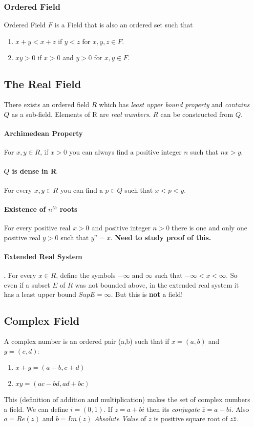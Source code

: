 \documentclass{article}
\begin{document}
	  \subsubsection{Ordered Field}
	  Ordered Field $F$ is a Field that is also an ordered set such that 
	  \begin{enumerate}
	  	\item $x + y < x + z$ if $y < z$ for $x,y,z \in F$.
	  	\item $xy > 0$ if $x > 0$ and $y > 0$ for $x,y \in F$.
	  \end{enumerate}
	 
	\subsection{The Real Field}
	There exists an ordered field $R$ which has \emph{least upper bound property} and \emph{contains $Q$} as a sub-field. Elements of R are \emph{real numbers}.
	$R$ can be constructed from $Q$.
	
	\paragraph{Archimedean Property} For $x,y \in R$, if $x > 0$ you can always find a positive integer $n$ such that $nx > y$.
	\paragraph{$Q$ is dense in R} For every $x,y \in R$ you can find a $p \in Q$ such that $x < p < y$.
	\paragraph{Existence of $n^{th}$ roots} For every positive real $x > 0$ and positive integer $n > 0$ there is one and only one positive real $y > 0$ such that $y^n = x$. \textbf{Need to study proof of this.}
	\paragraph{Extended Real System}. For every $x \in R$, define the symbols $-\infty$ and $\infty$ such that $-\infty < x < \infty$. So even if a subset  $E$ of $R$ was not bounded above, in the extended real system it has a least upper bound $Sup E = \infty$. But this is \textbf{not} a field!
	
	\subsection{Complex Field}
	A complex number is an ordered pair (a,b) such that if $x = (a,b)$ and $y = (c,d)$:
	\begin{enumerate}
		\item $x + y = (a+b, c+d)$
		\item $xy = (ac-bd, ad+bc)$ 
	\end{enumerate}
	This (definition of addition and multiplication) makes the set of complex numbers a field. We can define $i = (0,1)$. If $z = a+bi$ then its \textit{conjugate} $\bar{z} = a-bi$. Also $a=Re(z)$ and $b=Im(z)$
	\textit{Absolute Value} of $z$ is positive square root of $z\bar{z}$.
\end{document}
